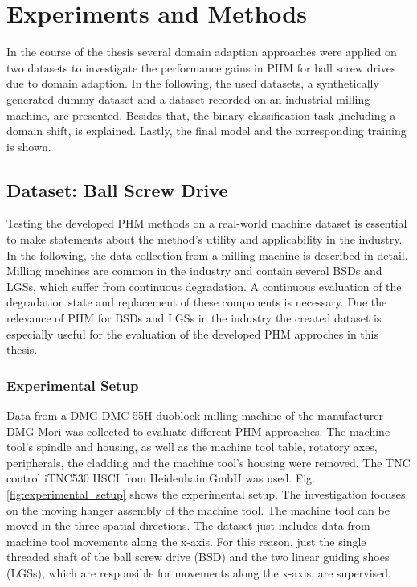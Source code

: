 \chapter{Experiments and Methods}\label{chapter:experiments}

In the course of the thesis several domain adaption approaches were applied on two datasets to investigate the performance gains in PHM for ball screw drives due to domain adaption. In the following, the used datasets, a synthetically generated dummy dataset and a dataset recorded on an industrial milling machine, are presented. Besides that, the binary classification task ,including a domain shift, is explained. Lastly, the final model and the corresponding training is shown.

\section{Dataset: Ball Screw Drive}
Testing the developed PHM methods on a real-world machine dataset is essential to make statements about the method's utility and applicability in the industry. In the following, the data collection from a milling machine is described in detail. Milling machines are common in the industry and contain several BSDs and LGSs, which suffer from continuous degradation. A continuous evaluation of the degradation state and replacement of these components is necessary. Due the relevance of PHM for BSDs and LGSs in the industry the created dataset is especially useful for the evaluation of the developed PHM approches in this thesis.

\subsection{Experimental Setup}
Data from a DMG DMC 55H duoblock milling machine of the manufacturer DMG Mori was collected to evaluate different PHM approaches. The machine tool’s spindle and housing, as well as the machine tool table, rotatory axes, peripherals, the cladding and the machine tool's housing were removed. The TNC control iTNC530 HSCI from Heidenhain GmbH was used. Fig. \ref{fig:experimental_setup} shows the experimental setup. The investigation focuses on the moving hanger assembly of the machine tool. The machine tool can be moved in the three spatial directions. The dataset just includes data from machine tool movements along the x-axis. For this reason, just the single threaded shaft of the ball screw drive (BSD) and the two linear guiding shoes (LGSs), which are responsible for movements along the x-axis, are supervised.


